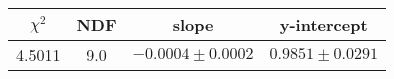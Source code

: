\begin{tabular}{|c|c|c|c|}

\hline
$\chi^{2}$ & NDF & slope & y-intercept  \\
\hline
4.5011 & 9.0 & $-0.0004\pm0.0002$ & $0.9851\pm0.0291$ \\
\hline

\end{tabular}